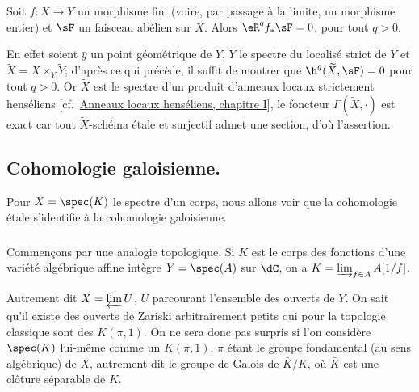 \begin{propositiondotdash}\label{I:2-3-6}
Soit $f:X\to Y$ un morphisme fini (voire, par passage à la limite, un 
morphisme entier) et $\sF$ un faisceau abélien sur $X$. Alors $\eR^q f_* \sF=0$, 
pour tout $q>0$.
\end{propositiondotdash}

En effet soient $\bar y$ un point géométrique de $Y$, $\widetilde Y$ le 
spectre du localisé strict de $Y$  et 
$\widetilde X=X\times_Y \widetilde Y$; d'après ce qui précède, il suffit de 
montrer que $\h^q(\widetilde X,\sF) = 0$ pour tout $q>0$. Or $\widetilde X$ est le 
spectre d'un produit d'anneaux locaux strictement henséliens 
[cf.\ \hyperlink{cite.ra70}{Anneaux locaux henséliens, chapitre I}], le foncteur $\Gamma(\widetilde X,\cdot)$ est exact car tout 
$\widetilde X$-schéma étale et surjectif admet une section, d'où l'assertion. 










\subsection{Cohomologie galoisienne.}\label{I:2-4}

Pour $X=\spec(K)$ le spectre d'un corps, nous allons voir que la cohomologie 
étale s'identifie à la cohomologie galoisienne. 





\subsubsection{}\label{I:2-4-1}

Commençons par une analogie topologique. Si $K$ est le corps des fonctions 
d'une variété algébrique affine intègre $Y=\spec(A)$ sur $\dC$, on a 
$K=\varinjlim_{f\in A} A[1/f]$. 

Autrement dit $X=\varprojlim U$, $U$ parcourant l'ensemble des ouverts de $Y$. 
On sait qu'il existe des ouverts de Zariski arbitrairement petits qui pour la 
topologie classique sont des $K(\pi,1)$. On ne sera donc pas surpris si l'on 
considère $\spec(K)$ lui-même comme un $K(\pi,1)$, $\pi$ étant le groupe 
fondamental (au sens algébrique) de $X$, autrement dit le groupe de Galois de 
$\bar K/K$, où $\bar K$ est une clôture séparable de $K$. 





